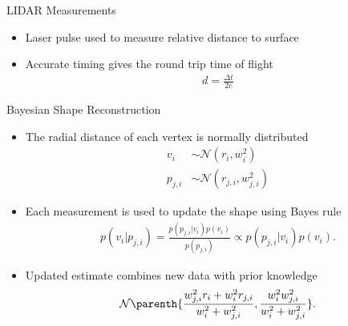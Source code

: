 \documentclass[11pt,professionalfonts]{beamer}
\begin{document}
\begin{frame}{LIDAR Measurements }
    \begin{itemize}
        \item<1-> Laser pulse used to measure relative distance to surface
        \item<2-> Accurate timing gives the round trip time of flight
            \begin{align*}
                d = \frac{\Delta t}{2 c}
            \end{align*}
    \end{itemize}
    
\end{frame}

\begin{frame}{Bayesian Shape Reconstruction}
    \begin{itemize}
        \item The radial distance of each vertex is normally distributed 
            \begin{align*}
                v_i &\sim \mathcal{N}(r_i, w_i^2) \\
                p_{j,i} &\sim \mathcal{N}(r_{j,i}, w_{j,i}^2)
            \end{align*}
        \item Each measurement is used to update the shape using Bayes rule 
            \begin{align*}
                p(v_i | p_{j, i}) = \frac{p(p_{j, i} | v_i) p(v_i)}{p( p_{j, i})} \propto p(p_{j,i} | v_i) p(v_i).
            \end{align*}
        \item Updated estimate combines new data with prior knowledge
    \begin{align*}\label{eq:posterior_probability}
        \mathcal{N} \parenth{\frac{w_{j, i}^2 r_i + w_i^2 r_{j, i}}{w_i^2 + w_{j, i}^2} , \frac{w_i^2  w_{j, i}^2}{w_i^2 +  w_{j, i}^2}} .
    \end{align*}
    \end{itemize}
\end{frame}
\end{document}
